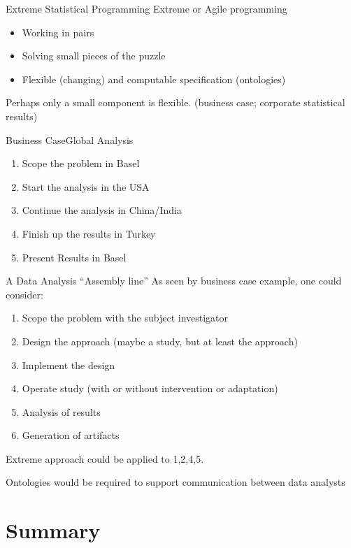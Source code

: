 \documentclass{beamer}
\begin{document}
\begin{frame}{Extreme Statistical Programming}
  Extreme or Agile programming
  \begin{itemize}
  \item Working in pairs
  \item Solving small pieces of the puzzle
  \item Flexible (changing) and computable  specification (ontologies)
  \end{itemize}
  Perhaps only a small component is flexible.
  \vspace*{1cm}
  (business case; corporate statistical results)
\end{frame}

\begin{frame}{Business Case}{Global Analysis}
  \begin{enumerate}
  \item Scope the problem in Basel
  \item Start the analysis in the USA
  \item Continue the analysis in China/India
  \item Finish up the results in Turkey
  \item Present Results in Basel
  \end{enumerate}
\end{frame}


\begin{frame}{A Data Analysis ``Assembly line''}
  As seen by business case example, one could consider:
  \begin{enumerate}
  \item Scope the problem with the subject investigator
  \item Design the approach (maybe a study, but at least the approach)
  \item Implement the design
  \item Operate study (with or without intervention or adaptation)
  \item Analysis of results
  \item Generation of artifacts
  \end{enumerate}
  Extreme approach could be applied to 1,2,4,5.

  Ontologies would be required to support communication between data
  analysts
\end{frame}


\section*{Summary}
\end{document}
